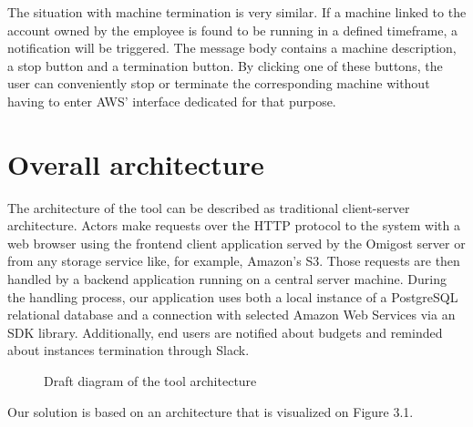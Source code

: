 \documentclass[licencjacka,en]{thesisclass}
\begin{document}
    \bigskip

    The situation with machine termination is very similar.
    If a machine linked to the account owned by the employee
    is found to be running in a defined timeframe, a notification will be triggered.
    The message body contains a machine description, a stop button and a termination button.
    By clicking one of these buttons, the user can conveniently
    stop or terminate the corresponding machine without having
    to enter AWS' interface dedicated for that purpose.


    \section{Overall architecture}


    The architecture of the tool can be described as traditional client-server architecture.
    Actors make requests over the HTTP protocol to the system with a web browser
    using the frontend client application
    served by the Omigost server or from any storage
    service like, for example, Amazon's S3.
    Those requests are then handled by a backend application running on a central server machine.
    During the handling process, our application uses both a local instance
    of a PostgreSQL relational database
    and a connection with selected Amazon Web Services via an SDK library.
    Additionally, end users are notified about budgets
    and reminded about instances termination through Slack.

    \begin{figure}[H]
      \caption{Draft diagram of the tool architecture\label{fig:arch-diag}}
    \end{figure}

    Our solution is based on an architecture that is visualized on Figure 3.1.
\end{document}
